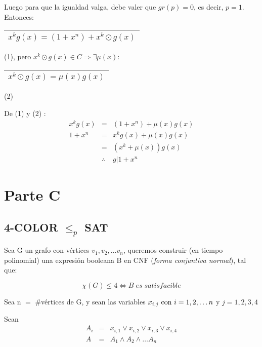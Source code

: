 \documentclass[12pt,a4paper]{report}
\begin{document}
		Luego para que la igualdad valga, debe valer que $gr(p)	= 0$, es decir, $p = 1$. Entonces: \begin{tabular}{|c|} \hline $ x^{k} g(x) = (1 + x^{n}) + x^{k} \odot g(x) $ \\ \hline \end{tabular} (1), pero $x^{k} \odot g(x) \in C \Rightarrow \exists \mu(x) :$ \begin{tabular}{|c|} \hline $ x^{k} \odot g(x) = \mu(x) g(x) $ \\ \hline \end{tabular} (2)

		\vspace{3mm}
		De (1) y (2)	:
		\begin{eqnarray}
			\nonumber x^{k} g(x) &=& (1 + x^{n}) + \mu(x) g(x) \\
			\nonumber 1 + x^{n} &=& x^{k} g(x) + \mu(x) g(x) \\
			\nonumber &=& (x^{k} + \mu(x)) g(x) \\
			\nonumber & \therefore & g | 1 + x^{n}
		\end{eqnarray}

\chapter{Parte C}

	\section{4-COLOR $\leq_{\textit{p}}$ SAT}
		Sea G un grafo con vértices $v_{1}, v_{2}, \dotsc v_{n}$, queremos construir (en tiempo polinomial) una expresión booleana B en CNF (\textit{forma conjuntiva normal}), tal que:

		\[ \chi(G) \leq 4 \Leftrightarrow B \; es \; satisfacible \]
		
		Sea n $=$ \#vértices de G, y sean las variables $x_{i, j} \textup{ con } i = 1, 2, \dotsc n$ y $j = 1, 2, 3, 4$
		
		Sean
		\begin{eqnarray}
			\nonumber A_{i} &=& x_{i, 1} \vee x_{i, 2} \vee x_{i, 3} \vee x_{i, 4}  \\
			\nonumber A &=& A_{1} \wedge A_{2} \wedge \dotsc A_{n}
		\end{eqnarray}
		
\end{document}
